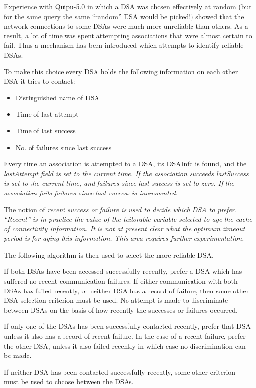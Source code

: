 Experience with Quipu-5.0 in which a DSA was chosen effectively at random
(but for the same query the same ``random'' DSA would be picked!)
showed that the network connections to some DSAs were much more unreliable
than others.
As a result, a lot of time was spent attempting associations that were almost
certain to fail.
Thus a mechanism has been introduced which attempts to identify reliable
DSAs.

To make this choice
every DSA holds the following information on each other DSA it tries to
contact:
\begin{itemize}
\item
Distinguished name of DSA
\item
Time of last attempt
\item
Time of last success
\item
No. of failures since last success
\end{itemize}
Every time an association is attempted to a DSA, its DSAInfo is found, and
the 
\it
lastAttempt
\rm
field is set to the current time.
If the association succeeds
\it
lastSuccess
\rm
is set to the current time, and 
\it
failures-since-last-success
\rm
is set to zero.
If the association fails
\it
failures-since-last-success
\rm
is incremented.

The notion of
\it
recent
\rm
success or failure is used to decide which DSA to prefer.  ``Recent'' is in
practice the value of the tailorable variable selected to age the cache of
connectivity information.  It is not at present clear what the optimum
timeout period is for aging this information.  This area requires further
experimentation.

The following algorithm is then used to select the more reliable DSA.

If both DSAs have been accessed successfully recently, prefer a DSA which
has suffered no recent communication failures.
If either communication with both DSAs has failed recently, or neither DSA
has a record of failure, then some other DSA selection criterion must be
used.  No attempt is made to discriminate between DSAs on the basis of how
recently the successes or failures occurred.

If only one of the DSAs has been successfully contacted recently, prefer
that DSA unless it also has a record of recent failure. In the case of a
recent failure, prefer the other DSA, unless it also failed recently in
which case no discrimination can be made.

If neither DSA has been contacted successfully recently, some other
criterion must be used to choose between the DSAs.
